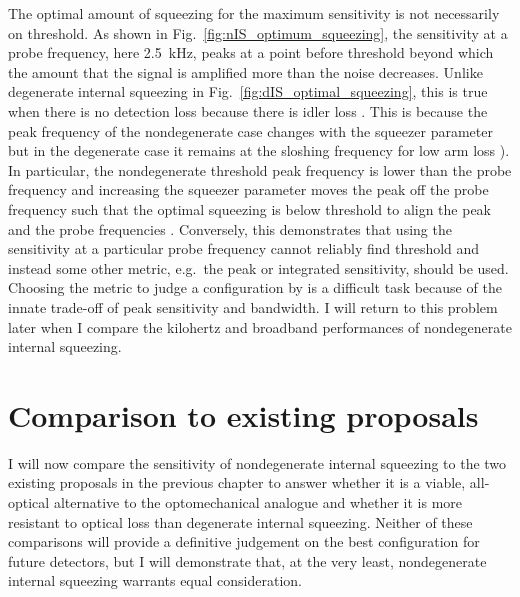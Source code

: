 The optimal amount of squeezing for the maximum sensitivity is not necessarily on threshold. As shown in Fig.~\ref{fig:nIS_optimum_squeezing}, the sensitivity at a probe frequency, here 2.5~kHz, peaks at a point before threshold beyond which the amount that the signal is amplified more than the noise decreases. Unlike degenerate internal squeezing in Fig.~\ref{fig:dIS_optimal_squeezing}, this is true when there is no detection loss because there is idler loss . This is because the peak frequency of the nondegenerate case changes with the squeezer parameter but in the degenerate case it remains at the sloshing frequency for low arm loss ). In particular, the nondegenerate threshold peak frequency is lower than the probe frequency and increasing the squeezer parameter moves the peak off the probe frequency such that the optimal squeezing is below threshold to align the peak and the probe frequencies . 
Conversely, this demonstrates that using the sensitivity at a particular probe frequency cannot reliably find threshold and instead some other metric, e.g.\ the peak or integrated sensitivity, should be used. Choosing the metric to judge a configuration by is a difficult task because of the innate trade-off of peak sensitivity and bandwidth. I will return to this problem later when I compare the kilohertz and broadband performances of nondegenerate internal squeezing.


\section{Comparison to existing proposals}

I will now compare the sensitivity of nondegenerate internal squeezing to the two existing proposals in the previous chapter to answer whether it is a viable, all-optical alternative to the optomechanical analogue and whether it is more resistant to optical loss than degenerate internal squeezing. Neither of these comparisons will provide a definitive judgement on the best configuration for future detectors, but I will demonstrate that, at the very least, nondegenerate internal squeezing warrants equal consideration.

